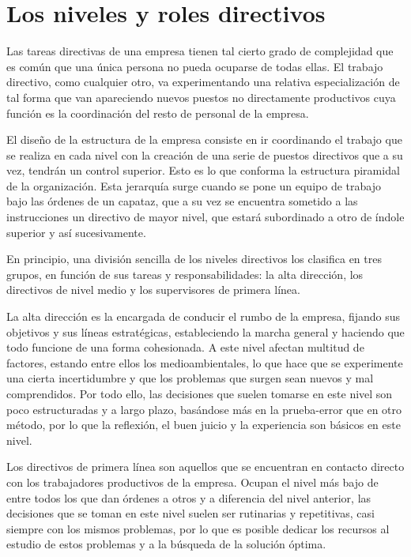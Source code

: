 \documentclass[
]{krantz}
\begin{document}
\hypertarget{los-niveles-y-roles-directivos}{%
\section{Los niveles y roles directivos}\label{los-niveles-y-roles-directivos}}

Las tareas directivas de una empresa tienen tal cierto grado de complejidad que es común que una única persona no pueda ocuparse de todas ellas. El trabajo directivo, como cualquier otro, va experimentando una relativa especialización de tal forma que van apareciendo nuevos puestos no directamente productivos cuya función es la coordinación del resto de personal de la empresa.

El diseño de la estructura de la empresa consiste en ir coordinando el trabajo que se realiza en cada nivel con la creación de una serie de puestos directivos que a su vez, tendrán un control superior. Esto es lo que conforma la estructura piramidal de la organización. Esta jerarquía surge cuando se pone un equipo de trabajo bajo las órdenes de un capataz, que a su vez se encuentra sometido a las instrucciones un directivo de mayor nivel, que estará subordinado a otro de índole superior y así sucesivamente.

En principio, una división sencilla de los niveles directivos los clasifica en tres grupos, en función de sus tareas y responsabilidades: la alta dirección, los directivos de nivel medio y los supervisores de primera línea.

La alta dirección es la encargada de conducir el rumbo de la empresa, fijando sus objetivos y sus líneas estratégicas, estableciendo la marcha general y haciendo que todo funcione de una forma cohesionada. A este nivel afectan multitud de factores, estando entre ellos los medioambientales, lo que hace que se experimente una cierta incertidumbre y que los problemas que surgen sean nuevos y mal comprendidos. Por todo ello, las decisiones que suelen tomarse en este nivel son poco estructuradas y a largo plazo, basándose más en la prueba-error que en otro método, por lo que la reflexión, el buen juicio y la experiencia son básicos en este nivel.

Los directivos de primera línea son aquellos que se encuentran en contacto directo con los trabajadores productivos de la empresa. Ocupan el nivel más bajo de entre todos los que dan órdenes a otros y a diferencia del nivel anterior, las decisiones que se toman en este nivel suelen ser rutinarias y repetitivas, casi siempre con los mismos problemas, por lo que es posible dedicar los recursos al estudio de estos problemas y a la búsqueda de la solución óptima.
\end{document}

